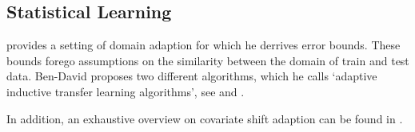 \subsection*{Statistical Learning}

\citep{bendavid2009training} provides a setting of domain adaption for which he derrives error bounds. These bounds forego assumptions on the similarity between the domain of train and test data. Ben-David proposes two different algorithms, which he calls `adaptive inductive transfer learning algorithms', see \citep{ben2003exploiting} and \citep{ben2007analysis}.
\bigskip

In addition, an exhaustive overview on covariate shift adaption can be found in \citep{sugiyama2012machine}.
